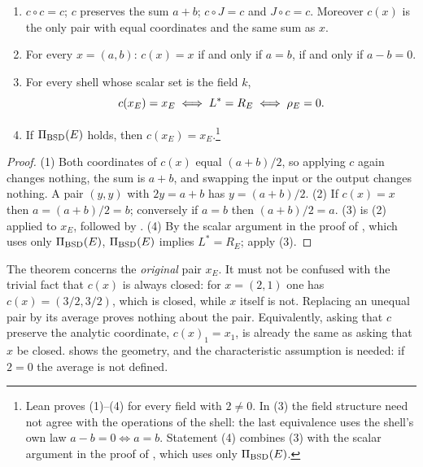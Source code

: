 \begin{theorem}\label{thm:closure:scalar-closure-translation}
\leavevmode
\begin{enumerate}
\item $c\circ c=c$; $c$ preserves the sum $a+b$; $c\circ J=c$ and
  $J\circ c=c$.  Moreover $c(x)$ is the only pair with equal coordinates
  and the same sum as $x$.
\item For every $x=(a,b)$: $c(x)=x$ if and only if $a=b$, if and only if
  $a-b=0$.
\item For every shell whose scalar set is the field $k$,
  \[
    c(x_E)=x_E
    \iff
    L^*=R_E
    \iff
    \rho_E=0 .
  \]
\item If $\Pi_{\mathrm{BSD}}(E)$ holds, then $c(x_E)=x_E$.\footnote{Lean proves (1)--(4) for every field with $2\neq0$.  In (3) the
field structure need not agree with the operations of the shell: the
last equivalence uses the shell's own law $a-b=0\iff a=b$.  Statement (4)
combines (3) with the scalar argument in the proof of
, which uses only $\Pi_{\mathrm{BSD}}(E)$.}
\end{enumerate}
\end{theorem}

\begin{proof}
(1) Both coordinates of $c(x)$ equal $(a+b)/2$, so applying $c$ again
changes nothing, the sum is $a+b$, and swapping the input or the output
changes nothing.  A pair $(y,y)$ with $2y=a+b$ has $y=(a+b)/2$.
(2) If $c(x)=x$ then $a=(a+b)/2=b$; conversely if $a=b$ then
$(a+b)/2=a$.  (3) is (2) applied to $x_E$, followed by
.  (4) By the scalar argument in the proof of
, which uses only $\Pi_{\mathrm{BSD}}(E)$,
$\Pi_{\mathrm{BSD}}(E)$ implies $L^*=R_E$; apply (3).
\end{proof}

The theorem concerns the \emph{original} pair $x_E$.  It must not be
confused with the trivial fact that $c(x)$ is always closed: for
$x=(2,1)$ one has $c(x)=(3/2,3/2)$, which is closed, while $x$ itself is
not.  Replacing an unequal pair by its average proves nothing about the
pair.  Equivalently, asking that $c$ preserve the analytic coordinate,
$c(x)_1=x_1$, is already the same as asking that $x$ be closed.
 shows the geometry, and the
characteristic assumption is needed: if $2=0$ the average is not
defined.



